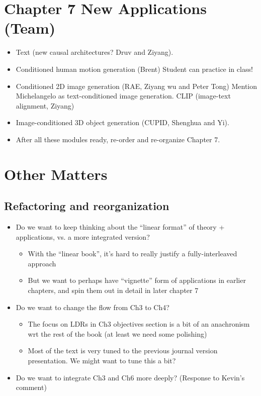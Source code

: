 \documentclass{article}
\begin{document}
\section{Chapter 7 New Applications (Team)}
\begin{itemize}
    \item Text (new causal architectures? Druv and Ziyang).
    \item Conditioned human motion generation (Brent) Student can practice in class!
    \item Conditioned 2D image generation (RAE, Ziyang wu and Peter Tong) Mention Michelangelo as text-conditioned image generation. CLIP (image-text alignment, Ziyang)
    \item Image-conditioned 3D object generation (CUPID, Shenghua and Yi). 
    \item After all these modules ready, re-order and re-organize Chapter 7. 
\end{itemize}


\section{Other Matters}
\subsection{Refactoring and reorganization}

\begin{itemize}
    \item Do we want to keep thinking about the ``linear format'' of theory + applications, vs. a more integrated version?
    \begin{itemize}
        \item With the ``linear book'', it's hard to really justify a fully-interleaved approach
        \item But we want to perhaps have ``vignette'' form of applications in earlier chapters, and spin them out in detail in later chapter 7
    \end{itemize}
    \item Do we want to change the flow from Ch3 to Ch4?
    \begin{itemize}
        \item The focus on LDRs in Ch3 objectives section is a bit of an anachronism wrt the rest of the book (at least we need some polishing)
        \item Most of the text is very tuned to the previous journal version presentation. We might want to tune this a bit?
    \end{itemize}
    \item Do we want to integrate Ch3 and Ch6 more deeply? (Response to Kevin's comment)
\end{itemize}
\end{document}
